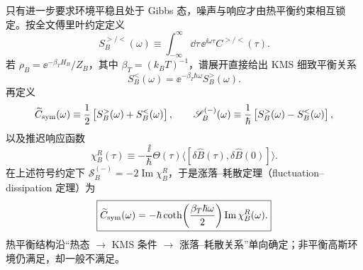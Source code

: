 只有进一步要求环境平稳且处于 Gibbs 态，噪声与响应才由热平衡约束相互锁定。按全文傅里叶约定定义
\begin{equation}
\boxed{
S_B^{>/<}(\omega)
\equiv\int_{-\infty}^{\infty}\dd\tau\,
\ee^{\ii\omega\tau}C^{>/<}(\tau).}
\label{eq:bath_greater_lesser_spectra}
\end{equation}
若 $\rho_B=\ee^{-\beta_T H_B}/Z_B$，其中 $\beta_T=(k_BT)^{-1}$，谱展开直接给出 KMS 细致平衡关系
\[
S_B^<(\omega)=\ee^{-\beta_T\hbar\omega}S_B^>(\omega).
\]
再定义
\[
\widetilde C_{\rm sym}(\omega)
\equiv\frac12\left[S_B^>(\omega)+S_B^<(\omega)\right],
\qquad
\mathscr S_B^{(-)}(\omega)
\equiv\frac{1}{\hbar}\left[S_B^>(\omega)-S_B^<(\omega)\right],
\]
以及推迟响应函数
\[
\chi_B^R(\tau)
\equiv-\frac{\ii}{\hbar}\Theta(\tau)
\langle[\delta\hat B(\tau),\delta\hat B(0)]\rangle.
\]
在上述符号约定下 $\mathscr S_B^{(-)}=-2\operatorname{Im}\chi_B^R$，于是涨落--耗散定理（fluctuation--dissipation 定理）为
\begin{equation}
\boxed{
\widetilde C_{\rm sym}(\omega)
=-\hbar\coth\!\left(\frac{\beta_T\hbar\omega}{2}\right)
\operatorname{Im}\chi_B^R(\omega).}
\label{eq:fdt_from_defined_correlators}
\end{equation}
热平衡结构沿“热态 $\to$ KMS 条件 $\to$ 涨落--耗散关系”单向确定；非平衡高斯环境仍满足，却一般不满足。

